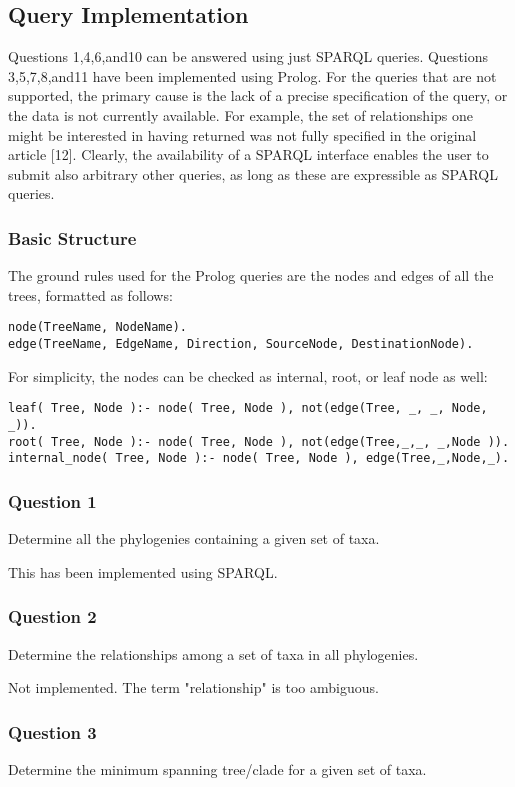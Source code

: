 \documentclass[10pt]{article}
\begin{document}
\subsection{Query Implementation}
Questions 1,4,6,and10 can be answered using just SPARQL queries.  Questions 3,5,7,8,and11 have been implemented using Prolog.   For the queries that are not supported, the primary cause is the lack of a precise specification of the query, or the data is not currently available. For example, the set of relationships one might be interested in having returned was not fully specified in the original article [12].  Clearly, the availability of a SPARQL interface enables the user to submit also arbitrary other queries, as long as these are expressible as SPARQL queries.
\subsubsection{Basic Structure}

The ground rules used for the Prolog queries are the nodes and edges of all the trees, formatted as follows:
\begin{verbatim}
node(TreeName, NodeName).
edge(TreeName, EdgeName, Direction, SourceNode, DestinationNode).
\end{verbatim}

For simplicity, the nodes can be checked as internal, root, or leaf node as well:
\begin{verbatim}
leaf( Tree, Node ):- node( Tree, Node ), not(edge(Tree, _, _, Node, _)).
root( Tree, Node ):- node( Tree, Node ), not(edge(Tree,_,_, _,Node )).
internal_node( Tree, Node ):- node( Tree, Node ), edge(Tree,_,Node,_).
\end{verbatim}

\subsubsection{Question 1}
 Determine all the phylogenies containing a given set of taxa.

This has been implemented using SPARQL.

\subsubsection{Question 2}
Determine the relationships among a set of taxa in all phylogenies.

Not implemented.  The term "relationship" is too ambiguous.

\subsubsection{Question 3}
Determine the minimum spanning tree/clade for a given set of taxa.
\end{document}
